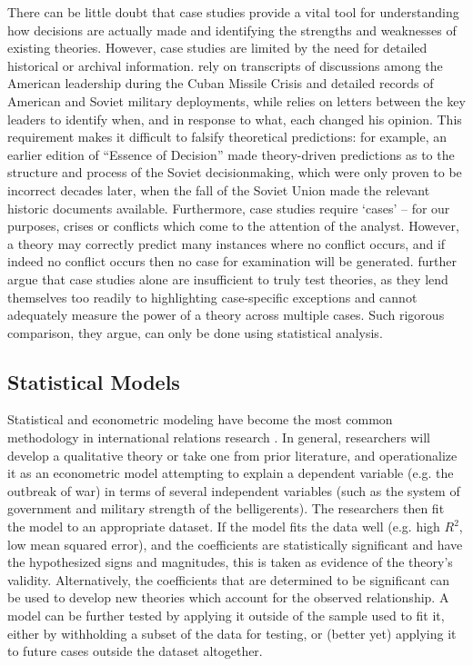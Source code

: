 There can be little doubt that case studies provide a vital tool for understanding how decisions are actually made and identifying the strengths and weaknesses of existing theories. However, case studies are limited by the need for detailed historical or archival information. \citet{allison_1999} rely on transcripts of discussions among the American leadership during the Cuban Missile Crisis and detailed records of American and Soviet military deployments, while \citet{kaufmann_1994} relies on letters between the key leaders to identify when, and in response to what, each changed his opinion. This requirement makes it difficult to falsify theoretical predictions: for example, an earlier edition of ``Essence of Decision'' \citep{allison_1971} made theory-driven predictions as to the structure and process of the Soviet decisionmaking, which were only proven to be incorrect decades later, when the fall of the Soviet Union made the relevant historic documents available. Furthermore, case studies require `cases' -- for our purposes, crises or conflicts which come to the attention of the analyst. However, a theory may correctly predict many instances where no conflict occurs, and if indeed no conflict occurs then no case for examination will be generated. \citet{achen_1989} further argue that case studies alone are insufficient to truly test theories, as they lend themselves too readily to highlighting case-specific exceptions and cannot adequately measure the power of a theory across multiple cases. Such rigorous comparison, they argue, can only be done using statistical analysis.

\subsection*{Statistical Models}\label{statistical-models}

Statistical and econometric modeling have become the most common methodology in international relations research \citep{colgan_2016}. In general, researchers will develop a qualitative theory or take one from prior literature, and operationalize it as an econometric model attempting to explain a dependent variable (e.g. the outbreak of war) in terms of several independent variables (such as the system of government and military strength of the belligerents). The researchers then fit the model to an appropriate dataset. If the model fits the data well (e.g. high $R^2$, low mean squared error), and the coefficients are statistically significant and have the hypothesized signs and magnitudes, this is taken as evidence of the theory's validity. Alternatively, the coefficients that are determined to be significant can be used to develop new theories which account for the observed relationship. A model can be further tested by applying it outside of the sample used to fit it, either by withholding a subset of the data for testing, or (better yet) applying it to future cases outside the dataset altogether.

